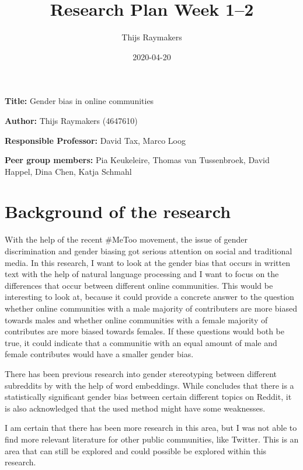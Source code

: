 \documentclass[english, a4paper, 11pt]{article}
\title{Research Plan Week 1--2}
\author{Thijs Raymakers}
\date{2020-04-20}
\newcommand{\namelistlabel}[1]{\mbox{#1}\hfil}
\newenvironment{namelist}[1]{%
\begin{list}{}
    {
        \let\makelabel\namelistlabel
        \settowidth{\labelwidth}{#1}
        \setlength{\leftmargin}{1.1\labelwidth}
    }
  }{%
\end{list}}
\begin{document}
\maketitle

\begin{namelist}{xxxxxxxxxxxxxxxxxxxxxxxxxxxxxxxxxxxxxxx}
\item[{\bf Title:}]
    Gender bias in online communities
\item[{\bf Author:}]
    Thijs Raymakers (4647610)
\item[{\bf Responsible Professor:}]
    David Tax, Marco Loog
\item[{\bf Peer group members:}]
    Pia Keukeleire, 
    Thomas van Tussenbroek,
    David Happel,
    Dina Chen,
    Katja Schmahl
\end{namelist}


\section*{Background of the research}
With the help of the recent \#MeToo movement, the issue of gender discrimination and 
gender biasing got serious attention on social and traditional media. In this research,
I want to look at the gender bias that occurs in written text with the help of natural
language processing and I want to focus on the differences that occur between different
online communities.
This would be interesting to look at, because it could provide a concrete answer to the
question whether online communities with a male majority of contributers are more biased 
towards males and whether online communities with a female majority of contributes are 
more biased towards females. If these questions would both be true, it could indicate that 
a communitie with an equal amount of male and female contributes would have a smaller
gender bias.

There has been previous research into gender stereotyping between different subreddits by \cite{kohn_2018_gender} with the help of word embeddings.  While \cite{kohn_2018_gender}
concludes that there is a statistically significant gender bias between certain different 
topics on Reddit, it is also acknowledged that the used method might have some weaknesses.

I am certain that there has been more research in this area, but I was not able to find
more relevant literature for other public communities, like Twitter. This is an area that
can still be explored and could possible be explored within this research.
\end{document}
